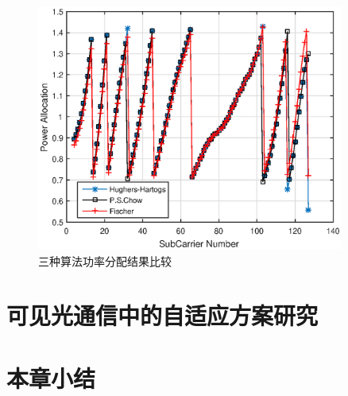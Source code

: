 \begin{figure}[htbp]
\centering
\includegraphics[width=0.9\textwidth]{figures/chapter-4/loadedPower.eps}
\caption{三种算法功率分配结果比较}
\label{fig:loadedPower}
\end{figure}

\section{可见光通信中的自适应方案研究}
\section{本章小结}

